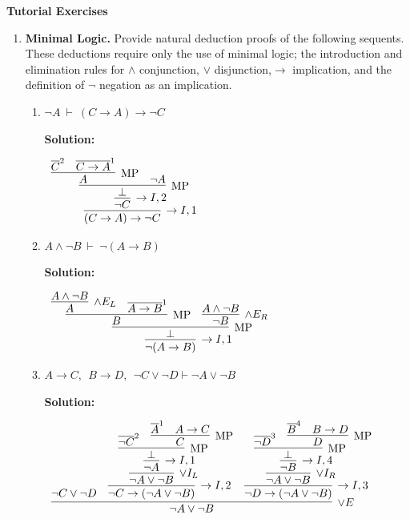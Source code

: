 \documentclass[11pt]{report}
\newcommand{\temp}[2]{{\overline{#2}}^{#1}}
\begin{document}
\newpage
{\bf Tutorial Exercises}
\begin{enumerate}

	\item \textbf{Minimal Logic.} Provide natural deduction proofs of the following sequents. These deductions require only the use of minimal logic; the introduction and elimination rules for $\land$ conjunction, $\lor$ disjunction,$\to$ implication, and the definition of $\lnot$ negation as an implication. 
	 
	\begin{enumerate}
		\item $\lnot A \ \vdash \ (C \to A) \to \lnot C$
		
		\textbf{Solution:}

		\begin{center}
			$\begin{array}{c}
				\infer[\to I, 1]{(C \to A) \to \lnot C}
					{\infer[\to I, 2]{\lnot C}
						{\infer[\MP]{\bot}
							{\infer[\MP]{A}{\temp{2}{C} & \temp{1}{C \to A}}
							&
							\lnot A}}}
			\end{array}$
		\end{center}

		\item $A \land \lnot B \ \vdash \ \lnot (A \to B)$
		
		\textbf{Solution:}

		\begin{center}
			$\begin{array}{c}
				\infer[\to I, 1]{\lnot (A \to B)}
					{\infer[\MP]{\bot}
						{\infer[\MP]{B}
							{\infer[\land E_{L}]{A}{A \land \lnot B}
							&
							\temp{1}{A \to B}}
						&
						\infer[\land E_{R}]{\lnot B}{A \land \lnot B}}}
			\end{array}$
		\end{center}

		\item $ A\to  C,\ \  B \to  D,\ \ \neg C \lor \neg  D \vdash  \neg A\lor \neg  B$
		
		\textbf{Solution:}

		\begin{center}
			$\begin{array}{c}
				\infer[\lor E]{\lnot A \lor \lnot B}
					{\lnot C \lor \lnot D
					&
					\infer[\to I, 2]{\lnot C \to (\lnot A \lor \lnot B)}
						{\infer[\lor I_{L}]{\lnot A \lor \lnot B}
							{\infer[\to I,1]{\lnot A}
								{\infer[\MP]{\bot}
									{\temp{2}{\lnot C}
									&
									\infer[\MP]{C}
										{\temp{1}{A}
										&
										A \to C}}}}}
					&
					\infer[\to I, 3]{\lnot D \to (\lnot A \lor \lnot B)}
						{\infer[\lor I_{R}]{\lnot A \lor \lnot B}
							{\infer[\to I,4]{\lnot B}
								{\infer[\MP]{\bot}
									{\temp{3}{\lnot D}
									&
									\infer[\MP]{D}
										{\temp{4}{B}
										&
										B \to D}}}}}}
			\end{array}$
		\end{center}


\end{enumerate}
\end{enumerate}
\end{document}
